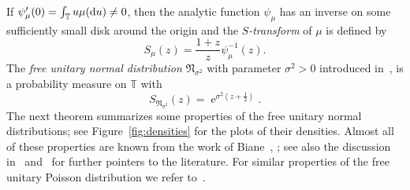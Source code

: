 \documentclass[10pt]{amsart}
\theoremstyle{definition}\newtheorem{defi}[theo]{Definition}\newtheorem{rema}[theo]{Remark}\newtheorem{exam}[theo]{Example}\newtheorem{exem}[theo]{Example}\newtheorem{nota}[theo]{Notation}
\DeclareMathOperator{\eee}{e}
\newcommand{\fnorm}{\mathfrak{N}}
\newcommand{\bT}{\mathbb{T}}
\newcommand*\dint{\text{\normalfont d}}
\begin{document}
If $\psi_\mu'(0) = \int_\bT u \mu(\dint u) \neq 0$, then the analytic function $\psi_\mu$ has an inverse on some sufficiently small disk around the origin and the \emph{$S$-transform} of $\mu$ is defined by
\begin{equation}\label{eq:S_transf_def}
S_\mu(z) = \frac {1+z}{z} \psi^{-1}_\mu(z).
\end{equation}
The \emph{free unitary normal distribution} $\fnorm_{\sigma^2}$ with parameter $\sigma^2>0$ introduced in~\cite[Lemmas~6.3]{bercovici_voiculescu_levy_hincin}, is a probability measure on $\bT$ with
\begin{equation}\label{eq:S_transf_normal}
S_{\fnorm_{\sigma^2}}(z) = \eee^{\sigma^2 \left(z + \frac 12\right)}.
\end{equation}
The next theorem summarizes some properties of the free unitary normal distributions; see Figure~\ref{fig:densities} for the plots of their densities. Almost all of these properties are known from the work of Biane~\cite{biane}, \cite[Proposition~10]{biane_segal_bargmann}; see also the discussion in~\cite[Proposition~2.24]{kemp} and~\cite[Remark~6.8]{levy_schur_weyl} for further pointers to the literature. For similar properties of the free unitary Poisson distribution we refer to~\cite[Section~5]{kabluchko_rep_diff_free_poi}.
\end{document}
